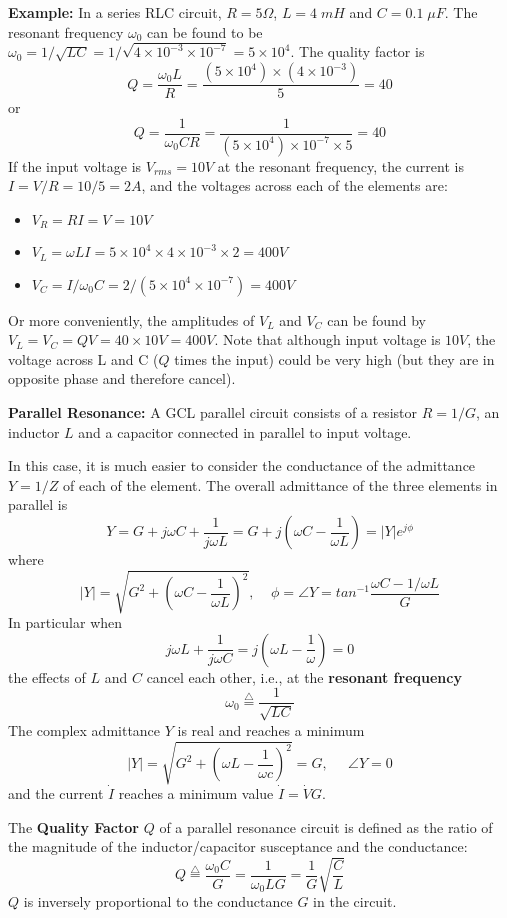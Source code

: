 {\bf Example: } In a series RLC circuit, $R=5\Omega$, $L=4\;mH$ and
$C=0.1\;\mu F$. The resonant frequency $\omega_0$ can be found to be
$\omega_0=1/\sqrt{LC}=1/\sqrt{4\times 10^{-3}\times 10^{-7}}=5\times 10^4$.
The quality factor is
\[	Q=\frac{\omega_0L}{R}=\frac{(5\times 10^4)\times (4\times 10^{-3})}{5}
	=40	\]
or
\[	Q=\frac{1}{\omega_0CR}=\frac{1}{(5\times 10^4)\times 10^{-7}\times 5}
	=40	\]
If the input voltage is $V_{rms}=10V$ at the resonant frequency, the current
is $I=V/R=10/5=2 A$, and the voltages across each of the elements are:
\begin{itemize}
\item $V_R=RI=V=10V$
\item $V_L=\omega L I=5\times 10^4\times 4\times 10^{-3} \times 2=400V$
\item $V_C=I/\omega_0C=2/(5\times 10^4\times 10^{-7})=400V$
\end{itemize}
Or more conveniently, the amplitudes of $V_L$ and $V_C$ can be found by
$ V_L=V_C=QV=40\times 10V=400V$. Note that although input voltage is $10V$,
the voltage across L and C ($Q$ times the input) could be very high (but
they are in opposite phase and therefore cancel).

{\bf Parallel Resonance:} A GCL parallel circuit consists of a resistor 
$R=1/G$, an inductor $L$ and a capacitor connected in parallel to 
input voltage. 


In this case, it is much easier to consider the conductance of the 
admittance $Y=1/Z$ of each of the element. The overall admittance of
the three elements in parallel is
\[ Y=G+j\omega C+\frac{1}{j\omega L}=G+j(\omega C-\frac{1}{\omega L})
	=|Y|e^{j\phi}	\]
where
\[	|Y|=\sqrt{G^2+(\omega C-\frac{1}{\omega L})^2},\;\;\;\;
	\phi=\angle Y=tan^{-1} \frac{\omega C-1/\omega L}{G} \]
In particular when
\[	j\omega L+\frac{1}{j\omega C}=j(\omega L-\frac{1}{\omega})=0 \]
the effects of $L$ and $C$ cancel each other, i.e., at the {\bf resonant
frequency}
\[	\omega_0\stackrel{\triangle}{=}\frac{1}{\sqrt{LC}}	\]
The complex admittance $Y$ is real and reaches a minimum
\[	|Y|=\sqrt{G^2+(\omega L-\frac{1}{\omega c})^2}=G,\;\;\;\;\;	
	\angle{Y}=0	\]
and the current $\dot{I}$ reaches a minimum value $\dot{I}=\dot{V}G$.

The {\bf Quality Factor} $Q$ of a parallel resonance circuit is defined
as the ratio of the magnitude of the inductor/capacitor susceptance and 
the conductance:
\[	Q\stackrel{\triangle}{=}\frac{\omega_0C}{G}=\frac{1}{\omega_0LG}
	=\frac{1}{G}\sqrt{\frac{C}{L}}	\]
$Q$ is inversely proportional to the conductance $G$ in the circuit.

